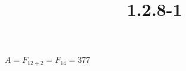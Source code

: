 \documentclass{article}
\title{1.2.8-1}
\begin{document}
\maketitle

$A = F_{12+2} = F_{14} = 377$
\end{document}
